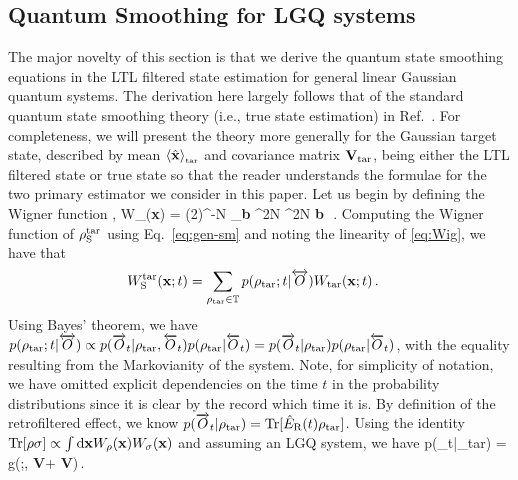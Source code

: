 \documentclass[./Main-revtex.tex]{subfiles}
\begin{document}
\subsection{Quantum Smoothing for LGQ systems}\label{MT:LQG}
The major novelty of this section is that we derive the quantum state smoothing equations in the LTL filtered state estimation for general linear Gaussian quantum systems. The derivation here largely follows that of the standard quantum state smoothing theory (i.e., true state estimation) in Ref.~\cite{laverick2019quantum}. For completeness, we will present the theory more generally for the Gaussian target state, described by mean $\langle \hat{\bf x} \rangle_{_{\rm tar}}$ and covariance matrix ${\bf V}_{\rm tar}$, being either the LTL filtered state or true state so that the reader understands the formulae for the two primary estimator we consider in this paper. Let us begin by defining the Wigner function \cite{wiseman2009quantum}, 
\beq\label{eq:Wig}
W_\rho({\bf x}) = (2\pi)^{-N} \int_{{\bf b} ^{2N}} \dd^{2N} {\bf b}\, \Tr[\rho e^{i{\bf b}\tp (\bx - {\bf x})}]\,.
\eeq
Computing the Wigner function of $\rho_{\text S}^{\rm tar}$ using Eq.~\eqref{eq:gen-sm} and noting the linearity of \eqref{eq:Wig}, we have that 
\begin{align}
W^{\rm tar}_{\text S}({\bf x};t) &= \sum_{\rho_{\rm tar} \in {\mathbb T}}p(\rho_{\rm tar};t|\overleftrightarrow{O}) W_{\rm tar}({\bf x};t)\,.
\end{align}
Using Bayes' theorem, we have $p(\rho_{\rm tar};t|\overleftrightarrow{O}) \propto p(\overrightarrow{O}_t|\rho_{\rm tar},\overleftarrow{O}_t)p(\rho_{\rm tar}|\overleftarrow{O}_t) = p(\overrightarrow{O}_t|\rho_{\rm tar})p(\rho_{\rm tar}|\overleftarrow{O}_t)$, with the equality resulting from the Markovianity of the system. Note, for simplicity of notation, we have omitted explicit dependencies on the time $t$ in the probability distributions since it is clear by the record which time it is. By definition of the retrofiltered effect, we know $p(\overrightarrow{O}_t|\rho_{\rm tar}) = {\rm Tr}[\hat{E}_{\text R}(t)\rho_{\rm tar}]$. Using the identity ${\rm Tr}[\rho\sigma] \propto \int{\rm d}{\bf x} W_{\rho}({\bf x})W_{\sigma}({\bf x})$ and assuming an LGQ system, we have 
\beq
p(_t|\rho_{\rm tar}) = g(\ex{\bx}\tar;\ex{\bx}\rfil, {\bf V}\rfil + {\bf V}\tar)\,.
\eeq
\end{document}
